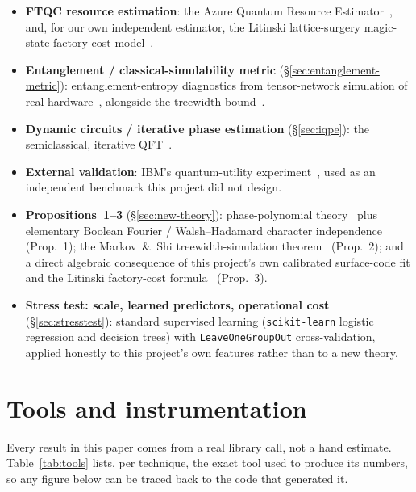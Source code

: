 \documentclass[9pt,twocolumn]{extarticle}
\begin{document}
\begin{itemize}[leftmargin=*,itemsep=1pt,topsep=2pt]
effective resistance~\cite{spielman2011}.
\item \textbf{FTQC resource estimation}: the Azure Quantum Resource
Estimator~\cite{azureqre}, and, for our own independent estimator, the
Litinski lattice-surgery magic-state factory cost
model~\cite{litinski2019game}.
\item \textbf{Entanglement / classical-simulability metric}
(\S\ref{sec:entanglement-metric}): entanglement-entropy diagnostics from
tensor-network simulation of real hardware~\cite{tindall2023tensor},
alongside the treewidth bound~\cite{markovshi2008}.
\item \textbf{Dynamic circuits / iterative phase estimation}
(\S\ref{sec:iqpe}): the semiclassical, iterative QFT~\cite{griffithsniu1996}.
\item \textbf{External validation}: IBM's quantum-utility
experiment~\cite{kim2023utility}, used as an independent benchmark this
project did not design.
\item \textbf{Propositions~1--3} (\S\ref{sec:new-theory}): phase-polynomial
theory~\cite{kissinger2019} plus elementary Boolean Fourier /
Walsh--Hadamard character independence (Prop.~1); the Markov~\&~Shi
treewidth-simulation theorem~\cite{markovshi2008} (Prop.~2); and a direct
algebraic consequence of this project's own calibrated surface-code fit
and the Litinski factory-cost formula~\cite{litinski2019game} (Prop.~3).
\item \textbf{Stress test: scale, learned predictors, operational cost}
(\S\ref{sec:stresstest}): standard supervised learning
(\texttt{scikit-learn} logistic regression and decision trees) with
\texttt{LeaveOneGroupOut} cross-validation, applied honestly to this
project's own features rather than to a new theory.
\end{itemize}

\section{Tools and instrumentation}
\label{sec:tools}
Every result in this paper comes from a real library call, not a hand
estimate. Table~\ref{tab:tools} lists, per technique, the exact tool used to
produce its numbers, so any figure below can be traced back to the code that
generated it.
\end{document}

